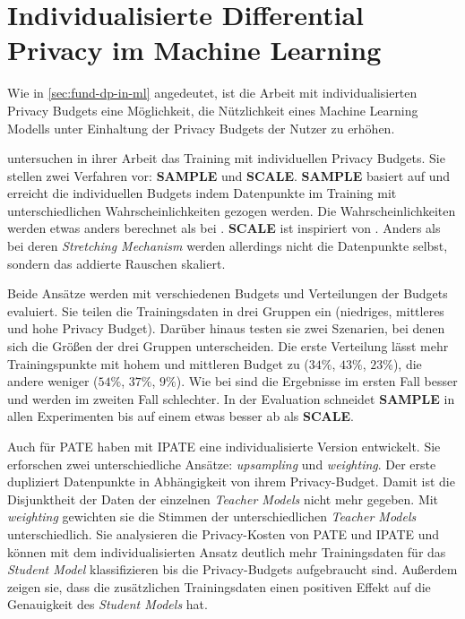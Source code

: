 \section{Individualisierte Differential Privacy im Machine Learning}\label{sec:rw-idp-ml}

Wie in \autoref{sec:fund-dp-in-ml} angedeutet, ist die Arbeit mit individualisierten Privacy Budgets eine Möglichkeit, die Nützlichkeit eines Machine Learning Modells unter Einhaltung der Privacy Budgets der Nutzer zu erhöhen.

\textcite{boenisch:2023} untersuchen in ihrer Arbeit das Training mit individuellen Privacy Budgets. Sie stellen zwei Verfahren vor: \textbf{SAMPLE} und \textbf{SCALE}. \textbf{SAMPLE} basiert auf \textcite{jorgensen:2015} und erreicht die individuellen Budgets indem Datenpunkte im Training mit unterschiedlichen Wahrscheinlichkeiten gezogen werden. Die Wahrscheinlichkeiten werden etwas anders berechnet als bei \textcite{jorgensen:2015}. \textbf{SCALE} ist inspiriert von \textcite{alaggan:2016}. Anders als bei deren \textit{Stretching Mechanism} werden allerdings nicht die Datenpunkte selbst, sondern das addierte Rauschen skaliert. 

Beide Ansätze werden mit verschiedenen Budgets und Verteilungen der Budgets evaluiert. Sie teilen die Trainingsdaten in drei Gruppen ein (niedriges, mittleres und hohe Privacy Budget). Darüber hinaus testen sie zwei Szenarien, bei denen sich die Größen der drei Gruppen unterscheiden. Die erste Verteilung lässt mehr Trainingspunkte mit hohem und mittleren Budget zu ($34\%$, $43\%$, $23\%$), die andere weniger ($54\%$, $37\%$, $9\%$). Wie bei \textcite{jorgensen:2015} sind die Ergebnisse im ersten Fall besser und werden im zweiten Fall schlechter. In der Evaluation schneidet \textbf{SAMPLE} in allen Experimenten bis auf einem etwas besser ab als \textbf{SCALE}.

Auch für PATE haben \textcite{boenisch:2023b} mit IPATE eine individualisierte Version entwickelt. Sie erforschen zwei unterschiedliche Ansätze: \textit{upsampling} und \textit{weighting}. Der erste dupliziert Datenpunkte in Abhängigkeit von ihrem Privacy-Budget. Damit ist die Disjunktheit der Daten der einzelnen \textit{Teacher Models} nicht mehr gegeben. Mit \textit{weighting} gewichten sie die Stimmen der unterschiedlichen \textit{Teacher Models} unterschiedlich. Sie analysieren die Privacy-Kosten von PATE und IPATE und können mit dem individualisierten Ansatz deutlich mehr Trainingsdaten für das \textit{Student Model} klassifizieren bis die Privacy-Budgets aufgebraucht sind. Außerdem zeigen sie, dass die zusätzlichen Trainingsdaten einen positiven Effekt auf die Genauigkeit des \textit{Student Models} hat.


